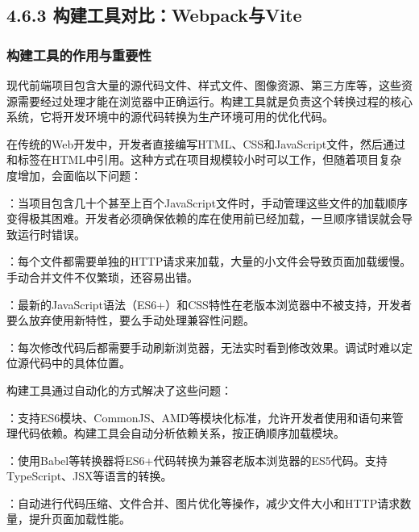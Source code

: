 \hypertarget{ux6784ux5efaux5de5ux5177ux5bf9ux6bd4webpackux4e0evite}{%
\subsection{4.6.3 构建工具对比：Webpack与Vite}\label{ux6784ux5efaux5de5ux5177ux5bf9ux6bd4webpackux4e0evite}}

\hypertarget{ux6784ux5efaux5de5ux5177ux7684ux4f5cux7528ux4e0eux91cdux8981ux6027}{%
\subsubsection{构建工具的作用与重要性}\label{ux6784ux5efaux5de5ux5177ux7684ux4f5cux7528ux4e0eux91cdux8981ux6027}}

现代前端项目包含大量的源代码文件、样式文件、图像资源、第三方库等，这些资源需要经过处理才能在浏览器中正确运行。构建工具就是负责这个转换过程的核心系统，它将开发环境中的源代码转换为生产环境可用的优化代码。

在传统的Web开发中，开发者直接编写HTML、CSS和JavaScript文件，然后通过和标签在HTML中引用。这种方式在项目规模较小时可以工作，但随着项目复杂度增加，会面临以下问题：

：当项目包含几十个甚至上百个JavaScript文件时，手动管理这些文件的加载顺序变得极其困难。开发者必须确保依赖的库在使用前已经加载，一旦顺序错误就会导致运行时错误。

：每个文件都需要单独的HTTP请求来加载，大量的小文件会导致页面加载缓慢。手动合并文件不仅繁琐，还容易出错。

：最新的JavaScript语法（ES6+）和CSS特性在老版本浏览器中不被支持，开发者要么放弃使用新特性，要么手动处理兼容性问题。

：每次修改代码后都需要手动刷新浏览器，无法实时看到修改效果。调试时难以定位源代码中的具体位置。

构建工具通过自动化的方式解决了这些问题：

：支持ES6模块、CommonJS、AMD等模块化标准，允许开发者使用和语句来管理代码依赖。构建工具会自动分析依赖关系，按正确顺序加载模块。

：使用Babel等转换器将ES6+代码转换为兼容老版本浏览器的ES5代码。支持TypeScript、JSX等语言的转换。

：自动进行代码压缩、文件合并、图片优化等操作，减少文件大小和HTTP请求数量，提升页面加载性能。

